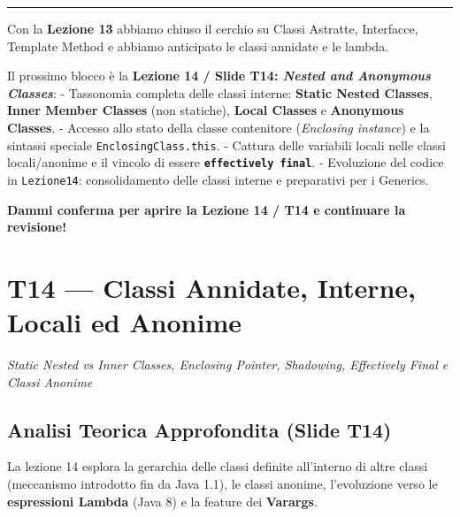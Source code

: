 \documentclass[11pt,a4paper,oneside]{report}
\newcommand{\passthrough}[1]{#1}
\begin{document}
\begin{center}\rule{0.5\linewidth}{0.5pt}\end{center}

\begin{studynote} Con la \textbf{Lezione 13} abbiamo chiuso il cerchio su
Classi Astratte, Interfacce, Template Method e abbiamo anticipato le
classi annidate e le lambda.

Il prossimo blocco è la \textbf{Lezione 14 / Slide T14: \emph{Nested and
Anonymous Classes}}: - Tassonomia completa delle classi interne:
\textbf{Static Nested Classes}, \textbf{Inner Member Classes} (non
statiche), \textbf{Local Classes} e \textbf{Anonymous Classes}. -
Accesso allo stato della classe contenitore (\emph{Enclosing instance})
e la sintassi speciale \passthrough{\lstinline!EnclosingClass.this!}. -
Cattura delle variabili locali nelle classi locali/anonime e il vincolo
di essere \textbf{\passthrough{\lstinline!effectively final!}}. -
Evoluzione del codice in \passthrough{\lstinline!Lezione14!}:
consolidamento delle classi interne e preparativi per i Generics.
\end{studynote}

\textbf{Dammi conferma per aprire la Lezione 14 / T14 e continuare la
revisione!}

\newpage
\chapter[T14 --- Classi Annidate, Interne, Locali ed]{T14 --- Classi Annidate, Interne, Locali ed Anonime}
\label{chap:t14}

{\small\sffamily\color{accentblue!80!black}\textit{Static Nested vs Inner Classes, Enclosing Pointer, Shadowing, Effectively Final e Classi Anonime}}

\vspace{0.8em}

\section{Analisi Teorica Approfondita (Slide
T14)}\label{chap13_analisi-teorica-approfondita-slide-t14}

La lezione 14 esplora la gerarchia delle classi definite all'interno di
altre classi (meccanismo introdotto fin da Java 1.1), le classi anonime,
l'evoluzione verso le \textbf{espressioni Lambda} (Java 8) e la feature
dei \textbf{Varargs}.
\end{document}
